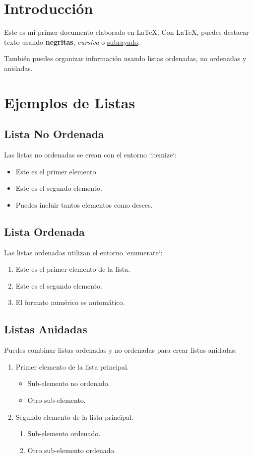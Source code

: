 \documentclass[12pt,a4paper]{article} %
\begin{document}
\section{Introducción} %
Este es mi primer documento elaborado en \LaTeX. Con \LaTeX, puedes destacar texto usando \textbf{negritas}, \textit{cursiva} o \underline{subrayado}. 

También puedes organizar información usando listas ordenadas, no ordenadas y anidadas.

\section{Ejemplos de Listas} %

\subsection{Lista No Ordenada} %
Las listas no ordenadas se crean con el entorno `itemize`:
\begin{itemize}
    \item Este es el primer elemento.
    \item Este es el segundo elemento.
    \item Puedes incluir tantos elementos como desees.
\end{itemize}

\subsection{Lista Ordenada} %
Las listas ordenadas utilizan el entorno `enumerate`:
\begin{enumerate}
    \item Este es el primer elemento de la lista.
    \item Este es el segundo elemento.
    \item El formato numérico es automático.
\end{enumerate}

\subsection{Listas Anidadas} %
Puedes combinar listas ordenadas y no ordenadas para crear listas anidadas:
\begin{enumerate}
    \item Primer elemento de la lista principal.
    \begin{itemize}
        \item Sub-elemento no ordenado.
        \item Otro sub-elemento.
    \end{itemize}
    \item Segundo elemento de la lista principal.
    \begin{enumerate}
        \item Sub-elemento ordenado.
        \item Otro sub-elemento ordenado.
    \end{enumerate}
\end{enumerate}
\end{document}
